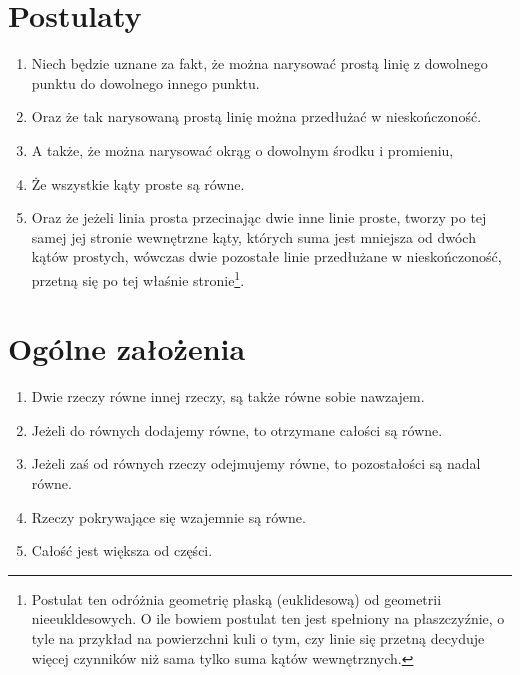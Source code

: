 \documentclass[12pt, a4paper]{article}
\begin{document}
\section*{Postulaty}

\begin{enumerate}
    \itemsep0em
    \item \mkpost
        Niech będzie uznane za fakt, że można narysować prostą linię z
        dowolnego punktu do dowolnego innego punktu.
    \item \mkpost
        Oraz że tak narysowaną prostą linię można przedłużać w nieskończoność.\
    \item \mkpost
        A także, że można narysować okrąg o dowolnym środku i promieniu,
    \item \mkpost Że wszystkie kąty proste są równe.
    \item \mkpost Oraz że jeżeli linia prosta przecinając dwie inne linie proste,
        tworzy po tej samej jej stronie wewnętrzne kąty, których suma jest
        mniejsza od dwóch kątów prostych, wówczas dwie pozostałe linie
        przedłużane w nieskończoność, przetną się po tej właśnie
        stronie\footnote{
            Postulat ten odróżnia geometrię płaską (euklidesową) od geometrii
            nieeukldesowych. O ile bowiem postulat ten jest spełniony na
            płaszczyźnie, o tyle na przykład na powierzchni kuli o tym, czy
            linie się przetną decyduje więcej czynników niż sama tylko suma
            kątów wewnętrznych.
        }.
\end{enumerate}

\begin{figure}[!h]
    \begin{center}
    \end{center}
\end{figure}

\section*{Ogólne założenia}

\begin{enumerate}
    \itemsep0em
    \item \mkcommon Dwie rzeczy równe innej rzeczy, są także równe sobie nawzajem.
    \item \mkcommon Jeżeli do równych dodajemy równe, to otrzymane całości są równe.
    \item \mkcommon
        Jeżeli zaś od równych rzeczy odejmujemy równe, to pozostałości są nadal
        równe.
    \item \mkcommon Rzeczy pokrywające się wzajemnie są równe.
    \item \mkcommon Całość jest większa od części.
\end{enumerate}
\end{document}
